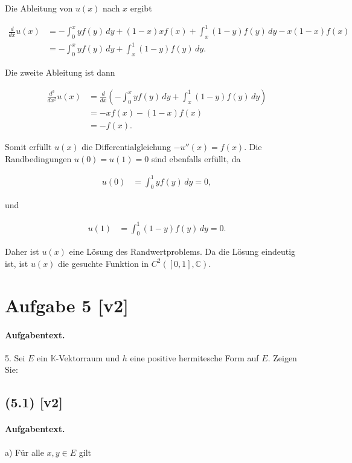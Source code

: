 \documentclass[11pt,a4paper]{article}
\begin{document}
Die Ableitung von \( u(x) \) nach \( x \) ergibt

\begin{align*}
\frac{d}{dx} u(x) &= -\int_0^x y f(y) \, dy + (1-x) x f(x) + \int_x^1 (1-y) f(y) \, dy - x(1-x) f(x) \\
&= -\int_0^x y f(y) \, dy + \int_x^1 (1-y) f(y) \, dy.
\end{align*}

Die zweite Ableitung ist dann

\begin{align*}
\frac{d^2}{dx^2} u(x) &= \frac{d}{dx} \left(-\int_0^x y f(y) \, dy + \int_x^1 (1-y) f(y) \, dy\right) \\
&= -x f(x) - (1-x) f(x) \\
&= -f(x).
\end{align*}

Somit erfüllt \( u(x) \) die Differentialgleichung \( -u''(x) = f(x) \). Die Randbedingungen \( u(0) = u(1) = 0 \) sind ebenfalls erfüllt, da

\begin{align*}
u(0) &= \int_0^1 y f(y) \, dy = 0,
\end{align*}

und

\begin{align*}
u(1) &= \int_0^1 (1-y) f(y) \, dy = 0.
\end{align*}

Daher ist \( u(x) \) eine Lösung des Randwertproblems. Da die Lösung eindeutig ist, ist \( u(x) \) die gesuchte Funktion in \( C^2([0,1], \mathbb{C}) \).


\section*{Aufgabe 5 [v2]}
\paragraph{Aufgabentext.}
5. Sei $E$ ein $\mathbb{K}$-Vektorraum und $h$ eine positive hermitesche Form auf $E$. Zeigen Sie:

\subsection*{(5.1) [v2]}
\paragraph{Aufgabentext.}
a) Für alle $x, y \in E$ gilt
\end{document}
